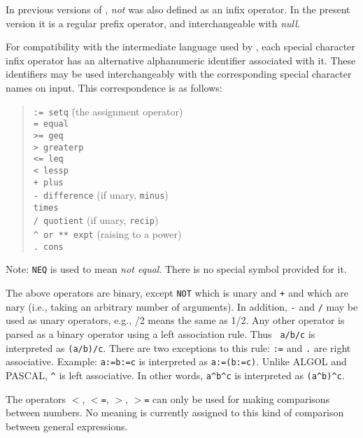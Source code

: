 In previous versions of {\REDUCE}, {\em not} was also defined as an infix
operator.  In the present version it is a regular prefix operator, and
interchangeable with {\em null}.

For compatibility with the intermediate language used by {\REDUCE}, each
special character infix operator has an alternative
alphanumeric identifier associated with it.  These identifiers may be used
interchangeably with the corresponding special character names on input.
This correspondence is as follows:
\begin{quote}
\begin{tabbing}
{\tt :=      setq} \hspace{0.5in} \= (the assignment operator) \\
{\tt =       equal} \\
{\tt >=      geq} \\
{\tt >       greaterp} \\
{\tt <=      leq} \\
{\tt <       lessp} \\
{\tt +       plus} \\
{\tt -       difference} \> (if unary, {\tt minus}) \\
{\tt *       times} \\
{\tt /       quotient} \> (if unary, {\tt recip}) \\
{\tt \verb|^| or ** expt} \> (raising to a power) \\
{\tt .       cons}
\end{tabbing}
\end{quote}
Note: {\tt NEQ} is used to mean {\em not equal}.  There is no special
symbol provided for it.

The above operators are binary, except {\tt NOT} which is
unary and {\tt +} and {\tt *} which are nary (i.e., taking an arbitrary
number of arguments).  In addition, {\tt -} and {\tt /} may be used as
unary operators, e.g., /2 means the same as 1/2.  Any other operator is
parsed as a binary operator using a left association rule.  Thus {\tt
a/b/c} is interpreted as {\tt (a/b)/c}.  There are two exceptions to this
rule: {\tt :=} and {\tt .} are right associative.  Example: {\tt a:=b:=c}
is interpreted as {\tt a:=(b:=c)}.  Unlike ALGOL and PASCAL, {\tt \verb|^|} is
left associative.  In other words, {\tt a\verb|^|b\verb|^|c} is interpreted as
{\tt (a\verb|^|b)\verb|^|c}.

The operators {\tt $<$}, {\tt $<$=}, {\tt $>$}, {\tt $>$=}
can only be used for making comparisons between numbers.  No meaning is
currently assigned to this kind of comparison between general expressions.

